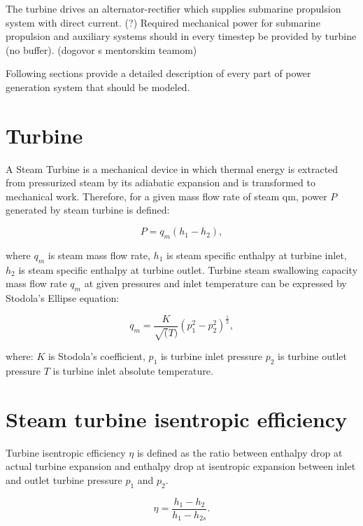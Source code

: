 \documentclass{article}
\begin{document}
	The turbine drives an alternator-rectifier which supplies submarine propulsion system with direct current. (?) Required mechanical power for submarine propulsion and auxiliary systems should in every timestep be provided by turbine (no buffer). (dogovor s mentorskim teamom)
	
	Following sections provide a detailed description of every part of power generation system that should be modeled.
	
	\section{Turbine}
	
	A Steam Turbine is a mechanical device in which thermal energy is extracted from pressurized steam by its adiabatic expansion and is transformed to mechanical work.  Therefore, for a given mass flow rate of steam qm, power $P$ generated by steam turbine is defined:
	
	\begin{equation}\label{eq:power}
		P = q_m(h_1 - h_2),
	\end{equation}
	
	where 
	$q_m$ is steam mass flow rate, 
	$h_1$ is steam specific enthalpy at turbine inlet,
	$h_2$ is steam specific enthalpy at turbine outlet.
	Turbine steam swallowing capacity mass flow rate $q_m$ at given pressures and inlet temperature can be expressed by Stodola’s Ellipse equation:
	
	\begin{equation}\label{eq:stodola}
		q_m = \frac{K}{\sqrt(T)}(p_1^2 - p_2^2)^\frac{1}{2},
	\end{equation}
	
	where:
	$K$ is Stodola’s coefficient, 
	$p_1$ is turbine inlet pressure
	$p_2$ is turbine outlet pressure
	$T$ is turbine inlet absolute temperature.
	
	\section{Steam turbine isentropic efficiency}
	
	Turbine isentropic efficiency $\eta$ is defined as the ratio between enthalpy drop at actual turbine expansion and enthalpy drop at isentropic expansion between inlet and outlet turbine pressure $p_1$ and $p_2$.
	
	\begin{equation}\label{eq:eta}
		\eta = \frac{h_1-h_2}{h_1 - h_{2s}}.
	\end{equation}
	
\end{document}
